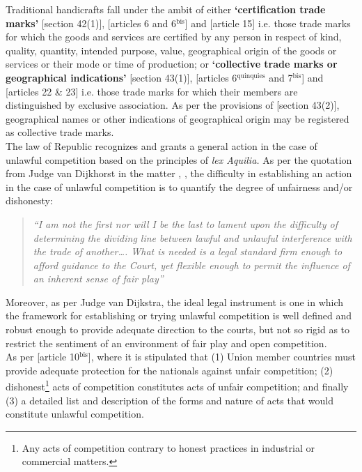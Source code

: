 \documentclass[11pt]{article}
\begin{document}
Traditional handicrafts fall under the ambit of either \textbf{`certification trade
marks'} [section 42(1)]\cite{rsa93_tm_act}, [articles 6 and
6\(^{\text{bis}}\)]\cite{wipo83_paris_conve_protect_ip} and [article 15]\cite{wto17_trips} i.e.
those trade marks for which the goods and services are certified by any person
in respect of kind, quality, quantity, intended purpose, value, geographical
origin of the goods or services or their mode or time of production; or
\textbf{`collective trade marks or geographical indications'} [section
43(1)]\cite{rsa93_tm_act}, [articles 6\(^{\text{quinquies}}\) and
7\(^{\text{bis}}\)]\cite{wipo83_paris_conve_protect_ip} and [articles 22 \&
23]\cite{wto17_trips} i.e. those trade marks for which their members are
distinguished by exclusive association. As per the provisions of [section
43(2)]\cite{rsa93_tm_act}, geographical names or other indications of geographical
origin may be registered as collective trade marks.\\

The law of Republic recognizes and grants a general action in the case of
unlawful competition based on the principles of \emph{lex Aquilia.} As per the
quotation from Judge van Dijkhorst in the matter
, \cite{dijkhorst81_atlas_v_pikkewyn}, the
difficulty in establishing an action in the case of unlawful competition is to
quantify the degree of unfairness and/or dishonesty:
\begin{quote}
\textit{``I am not the first nor will I be the last to lament upon the difficulty of determining the dividing line between lawful and unlawful interference with the trade of another…. What is needed is a legal standard firm enough to afford guidance to the Court, yet flexible enough to permit the influence of an inherent sense of fair play''}
\end{quote}
Moreover, as per Judge van Dijkstra, the ideal legal instrument is one in which
the framework for establishing or trying unlawful competition is well defined
and robust enough to provide adequate direction to the courts, but not so rigid
as to restrict the sentiment of an environment of fair play and open
competition.\\

As per [article 10\(^{\text{bis}}\)]\cite{wipo83_paris_conve_protect_ip}, where it is
stipulated that (1) Union member countries must provide adequate protection for
the nationals against unfair competition; (2) dishonest\footnote{Any acts of
competition contrary to honest practices in industrial or commercial matters.}
acts of competition constitutes acts of unfair competition; and finally (3) a
detailed list and description of the forms and nature of acts that would
constitute unlawful competition.\\
\end{document}
